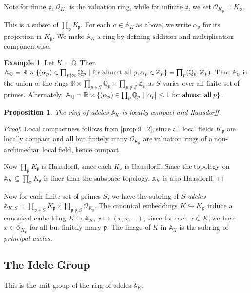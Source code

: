 \documentclass[11pt]{article}
\theoremstyle{definition}
\newtheorem{example}[definition]{Example}
\theoremstyle{plain}
\newtheorem{proposition}[definition]{Proposition}
\theoremstyle{remark}
\newcommand{\bA}{\mathbb{A}}
\newcommand{\ZZ}{\mathbb{Z}}
\newcommand{\QQ}{\mathbb{Q}}
\newcommand{\RR}{\mathbb{R}}
\newcommand{\cO}{\mathcal{O}}
\newcommand{\fp}{\mathfrak{p}}
\newcommand{\rprod}{\mathrlap{\prod}{\coprod}}
\begin{document}
Note for finite $\fp$, $\cO_{K_\fp}$ is the valuation ring, while for infinite $\fp$, we set $\cO_{K_\fp} = K_\fp$.

This is a subset of $\prod_{\fp} K_\fp$. For each $\alpha \in \bA_K$ as above, we write $\alpha_\fp$ for its projection in $K_\fp$. We make $\bA_K$ a ring by defining addition and multiplication componentwise.

\begin{example}\label{eg:9_4}
    Let $K = \QQ$. Then $\bA_\QQ = \RR \times \{(\alpha_p) \in \prod_{p \nmid \infty} \QQ_p \mid \text{for almost all } p, \alpha_p \in \ZZ_p\} = \rprod_{p} (\QQ_p, \ZZ_p)$. Thus $\bA_\QQ$ is the union of the rings $\RR \times \prod_{p \in S} \QQ_p \times \prod_{p \notin S} \ZZ_p$ as $S$ varies over all finite set of primes. Alternately, $\bA_\QQ = \RR \times \{(\alpha_p) \in \prod_p \QQ_p \mid \abs{\alpha_p} \le 1 \text{ for almost all } p\}$.
\end{example}

\begin{proposition}\label{prop:9_5}
    The ring of adeles $\bA_K$ is locally compact and Hausdorff.
\end{proposition}
\begin{proof}
    Local compactness follows from \autoref{prop:9_2}, since all local fields $K_\fp$ are locally compact and all but finitely many $\cO_{K_\fp}$ are valuation rings of a non-archimedian local field, hence compact.

    Now $\prod_{\fp} K_\fp$ is Hausdorff, since each $K_\fp$ is Hausdorff. Since the topology on $\bA_K \subseteq \prod_{\fp} K_\fp$ is finer than the subspace topology, $\bA_K$ is also Hausdorff.
\end{proof}

Now for each finite set of primes $S$, we have the subring of \emph{$S$-adeles} $\bA_{K,S} = \prod_{\fp \in S} K_\fp \times \prod_{\fp \notin S} \cO_{K_\fp}$. The canonical embeddings $K \hookrightarrow K_\fp$ induce a canonical embedding $K \hookrightarrow \bA_K$, $x \mapsto (x, x, \ldots)$, since for each $x \in K$, we have $x \in \cO_{K_\fp}$ for all but finitely many $\fp$. The image of $K$ in $\bA_K$ is the subring of \emph{principal adeles}.

\subsection{The Idele Group}

This is the unit group of the ring of adeles $\bA_K$.
\end{document}
